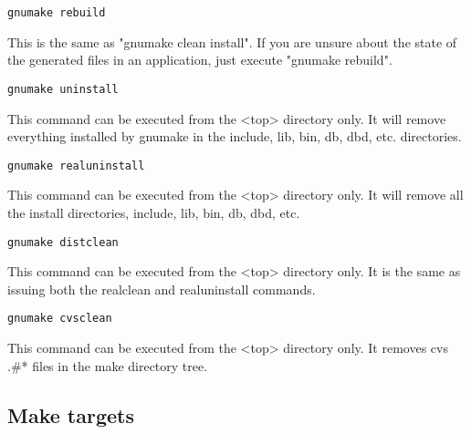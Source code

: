 \begin{description}
\item 

\end{description}\begin{verbatim}gnumake rebuild 
\end{verbatim}\begin{description}\item This is the same as "gnumake clean install". If you are unsure about the state of the generated files in an 
application, just execute "gnumake rebuild".

\item 

\end{description}\begin{verbatim}gnumake uninstall
\end{verbatim}\begin{description}\item This command can be executed from the \textless{}top\textgreater{} directory only. It will remove everything installed by gnumake in 
the include, lib, bin, db, dbd, etc. directories.

\item 

\end{description}\begin{verbatim}gnumake realuninstall
\end{verbatim}\begin{description}\item This command can be executed from the \textless{}top\textgreater{} directory only. It will remove all the install directories, include, lib, 
bin, db, dbd, etc.

\item 

\end{description}\begin{verbatim}gnumake distclean
\end{verbatim}\begin{description}\item This command can be executed from the \textless{}top\textgreater{} directory only. It is the same as issuing both the realclean and 
realuninstall commands.

\item 

\end{description}\begin{verbatim}gnumake cvsclean
\end{verbatim}\begin{description}\item This command can be executed from the \textless{}top\textgreater{} directory only. It removes cvs .\#* files in the make directory tree.

\end{description}\subsection{Make targets}


